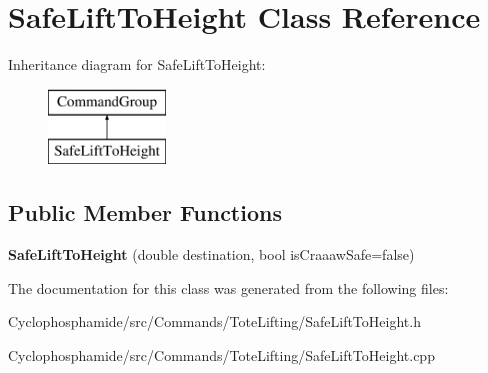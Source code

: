 \hypertarget{class_safe_lift_to_height}{}\section{Safe\+Lift\+To\+Height Class Reference}
\label{class_safe_lift_to_height}
Inheritance diagram for Safe\+Lift\+To\+Height\+:\begin{figure}[H]
\begin{center}
\leavevmode
\includegraphics[height=2.000000cm]{class_safe_lift_to_height}
\end{center}
\end{figure}
\subsection*{Public Member Functions}
\begin{DoxyCompactItemize}
\item 
\hypertarget{class_safe_lift_to_height_a165f933574d622580c6e2813286fec2b}{}{\bfseries Safe\+Lift\+To\+Height} (double destination, bool is\+Craaaw\+Safe=false)\label{class_safe_lift_to_height_a165f933574d622580c6e2813286fec2b}

\end{DoxyCompactItemize}


The documentation for this class was generated from the following files\+:\begin{DoxyCompactItemize}
\item 
Cyclophosphamide/src/\+Commands/\+Tote\+Lifting/Safe\+Lift\+To\+Height.\+h\item 
Cyclophosphamide/src/\+Commands/\+Tote\+Lifting/Safe\+Lift\+To\+Height.\+cpp\end{DoxyCompactItemize}
